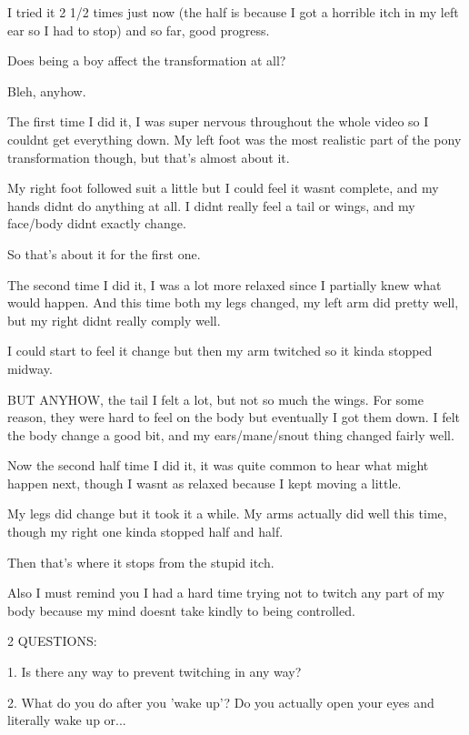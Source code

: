 \documentclass[ebook,12pt,oneside,openany]{memoir}
\begin{document}
\begin{tcolorbox}[title=Milk Wave]
\par{I tried it 2 1/2 times just now (the half is because I got a horrible itch in my left ear so I had to stop) and so far, good progress.}
\par{Does being a boy affect the transformation at all?}
\par{Bleh, anyhow.}
\newline{}
\par{\textcolor[RGB]{255,140,0}{The first time I did it, I was super nervous throughout the whole video so I couldnt get everything down. My left foot was the most realistic part of the pony transformation though, but that's almost about it.}}
\par{\textcolor[RGB]{255,140,0}{My right foot followed suit a little but I could feel it wasnt complete, and my hands didnt do anything at all. I didnt really feel a tail or wings, and my face/body didnt exactly change.}}
\par{\textcolor[RGB]{255,140,0}{So that's about it for the first one.}}
\par{\textcolor[RGB]{75,0,130}{The second time I did it, I was a lot more relaxed since I partially knew what would happen. And this time both my legs changed, my left arm did pretty well, but my right didnt really comply well.}}
\par{\textcolor[RGB]{75,0,130}{I could start to feel it change but then my arm twitched so it kinda stopped midway.}}
\par{\textcolor[RGB]{75,0,130}{BUT ANYHOW, the tail I felt a lot, but not so much the wings. For some reason, they were hard to feel on the body but eventually I got them down. I felt the body change a good bit, and my ears/mane/snout thing changed fairly well.}}
\newline{}
\par{\textcolor[RGB]{128,128,128}{Now the second half time I did it, it was quite common to hear what might happen next, though I wasnt as relaxed because I kept moving a little.}}
\par{\textcolor[RGB]{128,128,128}{My legs did change but it took it a while. My arms actually did well this time, though my right one kinda stopped half and half.}}
\par{\textcolor[RGB]{128,128,128}{Then that's where it stops from the stupid itch.}}
\newline{}
\par{Also I must remind you I had a hard time trying not to twitch any part of my body because my mind doesnt take kindly to being controlled.}
\newline{}
\par{\textcolor[RGB]{255,0,0}{2 QUESTIONS:}}
\newline{}
\par{\textcolor[RGB]{255,0,0}{1. Is there any way to prevent twitching in any way?}}
\newline{}
\par{\textcolor[RGB]{255,0,0}{2.  What do you do after you 'wake up'? Do you actually open your eyes and literally wake up or...}}
\end{tcolorbox}
\end{document}
